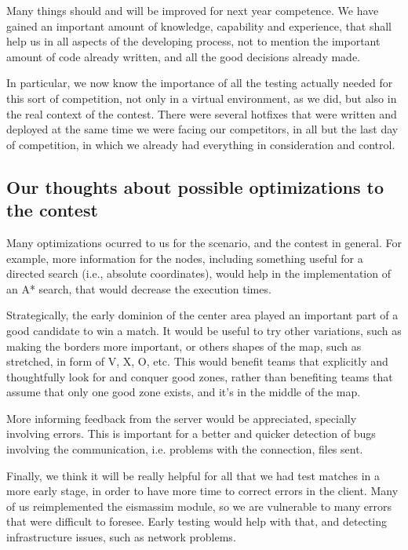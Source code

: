 \documentclass{llncs2e/llncs}
\begin{document}
    Many things should and will be improved for next year competence. We have
    gained an important amount of knowledge, capability and experience, that shall 
    help us in all aspects of the developing process, not to mention the 
    important amount of code already written, and all the good decisions already 
    made.

    In particular, we now know the importance of all the testing actually needed 
    for this sort of competition, not only in a virtual environment, as we did, 
    but also in the real context of the contest. There were several hotfixes that 
    were written and deployed at the same time we were facing our competitors, in 
    all but the last day of competition, in which we already had everything in 
    consideration and control.


\subsection{Our thoughts about possible optimizations to the contest}
    

    Many optimizations ocurred to us for the scenario, and the contest in general. 
    For example, more information for the nodes, including something useful for a 
    directed search (i.e., absolute coordinates), would help in the implementation 
    of an A* search, that would decrease the execution times.

    Strategically, the early dominion of the center area played an important part 
    of a good candidate to win a match. It would be useful to try other 
    variations, such as making the borders more important, or others shapes of the 
    map, such as stretched, in form of V, X, O, etc. This would benefit teams that 
    explicitly and thoughtfully look for and conquer good zones, rather than 
    benefiting teams that assume that only one good zone exists, and it's in the 
    middle of the map.

    More informing feedback from the server would be appreciated, specially
    involving errors. This is important for a better and quicker detection of bugs
    involving the communication, i.e. problems with the connection, files sent.

    Finally, we think it will be really helpful for all that we had test matches 
    in a more early stage, in order to have more time to correct errors in the 
    client. Many of us reimplemented the eismassim module, so we are vulnerable to 
    many errors that were difficult to foresee. Early testing would help with 
    that, and detecting infrastructure issues, such as network problems.
    
    

    
 
 

%
\end{document}
